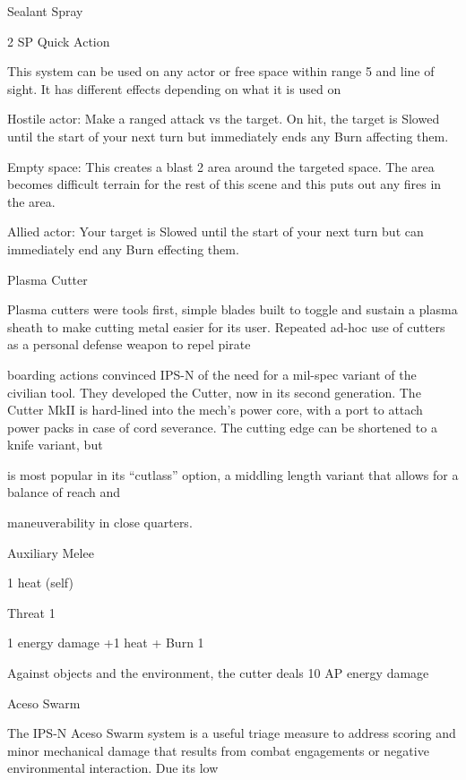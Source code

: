 Sealant Spray  

2 SP  
Quick Action  

This system can be used on any actor or free space within range 5 and line of sight. It has  
different effects depending on what it is used on
 
         	Hostile actor: Make a ranged attack vs the target. On hit, the target is Slowed until the  
         start of your next turn but immediately ends any Burn affecting them.
 
         	Empty space: This creates a blast 2 area around the targeted space. The area becomes  
         difficult terrain for the rest of this scene and this puts out any fires in the area.
 
         Allied actor: 	  Your target is Slowed until the start of your next turn but can immediately  
         end any Burn effecting them.
 

Plasma Cutter
 

Plasma cutters were tools first, simple blades built to toggle and sustain a plasma sheath to make cutting  
metal easier for its user. Repeated ad-hoc use of cutters as a personal defense weapon to repel pirate  

boarding actions convinced IPS-N of the need for a mil-spec variant of the civilian tool. They developed the  
Cutter, now in its second generation. The Cutter MkII is hard-lined into the mech’s power core, with a port  
to attach power packs in case of cord severance. The cutting edge can be shortened to a knife variant, but  

is most popular in its “cutlass” option, a middling length variant that allows for a balance of reach and  

maneuverability in close quarters.    
 

Auxiliary Melee
 
1 heat (self)
 
Threat 1
 
1 energy damage +1 heat + Burn 1
 
Against objects and the environment, the cutter deals 10 AP energy damage
 

                                                                                                                     


Aceso Swarm  

The IPS-N Aceso Swarm system is a useful triage measure to address scoring and minor mechanical  
damage that results from combat engagements or negative environmental interaction. Due its low  

